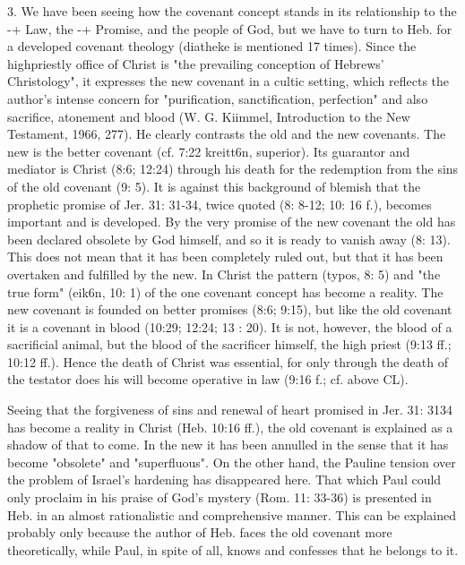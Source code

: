 				3. We have been seeing how the covenant concept stands in its relationship to the -+ Law, the -+ Promise, and the people of God, but we have to turn to Heb. for a developed covenant theology (diatheke is mentioned 17 times). Since the highpriestly office of Christ is "the prevailing conception of Hebrews' Christology", it expresses the new covenant in a cultic setting, which reflects the author's intense concern for "purification, sanctification, perfection" and also sacrifice, atonement and blood (W. G. Kiimmel, Introduction to the New Testament, 1966, 277). He clearly contrasts the old and the new covenants. The new is the better covenant (cf. 7:22 kreitt6n, superior). Its guarantor and mediator is Christ (8:6; 12:24) through his death for the redemption from the sins of the old covenant (9: 5). It is against this background of blemish that the prophetic promise of Jer. 31: 31-34, twice quoted (8: 8-12; 10: 16 f.), becomes important and is developed. By the very promise of the new covenant the old has been declared obsolete by God himself, and so it is ready to vanish away (8: 13). This does not mean that it has been completely ruled out, but that it has been overtaken and fulfilled by the new. In Christ the pattern (typos, 8: 5) and "the true form" (eik6n, 10: 1) of the one covenant concept has become a reality. The new covenant is founded on better promises (8:6; 9:15), but like the old covenant it is a covenant in blood (10:29; 12:24; 13 : 20). It is not, however, the blood of a sacrificial animal, but the blood of the sacrificer himself, the high priest (9:13 ff.; 10:12 ff.). Hence the death of Christ was essential, for only through the death of the testator does his will become operative in law (9:16 f.; cf. above CL). 

				Seeing that the forgiveness of sins and renewal of heart promised in Jer. 31: 3134 has become a reality in Christ (Heb. 10:16 ff.), the old covenant is explained as a shadow of that to come. In the new it has been annulled in the sense that it has become "obsolete" and "superfluous". On the other hand, the Pauline tension over the problem of Israel's hardening has disappeared here. That which Paul could only proclaim in his praise of God's mystery (Rom. 11: 33-36) is presented in Heb. in an almost rationalistic and comprehensive manner. This can be explained probably only because the author of Heb. faces the old covenant more theoretically, while Paul, in spite of all, knows and confesses that he belongs to it. 

